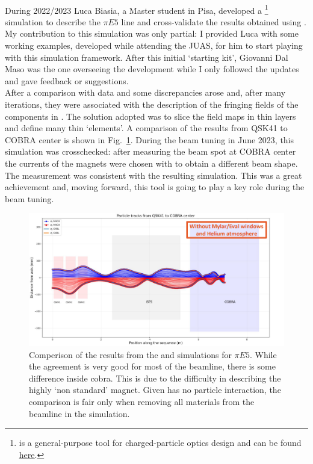 \begin{refsection}
        \paragraph{\madx} During 2022/2023 Luca Biasia, a Master student in Pisa, developed a \madx\footnote{\madx is a general-purpose tool for charged-particle optics design and can be found \href{http://madx.web.cern.ch/madx/}{\underline{here}}.} simulation to describe the $\pi E5$ line and cross-validate the results obtained using \gfb. 
        My contribution to this simulation was only partial: I provided Luca with some working \madx examples, developed while attending the JUAS, for him to start playing with this simulation framework. 
        After this initial `starting kit', Giovanni Dal Maso was the one overseeing the development while I only followed the updates and gave feedback or suggestions. \\
        After a comparison with data and \gfb some discrepancies arose and, after many iterations, they were associated with the description of the fringing fields of the components in \madx. 
        The solution adopted was to slice the field maps in thin layers and define many thin `\madx elements'. 
        A comparison of the results from QSK41 to COBRA center is shown in Fig.~\ref{fig:madx_vs_g4b}.
        During the beam tuning in June 2023, this simulation was crosschecked: after measuring the beam spot at COBRA center the currents of the magnets were chosen with \madx to obtain a different beam shape. 
        The measurement was consistent with the resulting simulation.
        This was a great achievement and, moving forward, this tool is going to play a key role during the beam tuning.

        \begin{figure}
            \centering
            \includegraphics[width = \textwidth]{Figures/MEG/madx_vs_g4b.png}
            \caption{Comperison of the results from the \gfb and \madx simulations for $\pi E5$. While the agreement is very good for most of the beamline, there is some difference inside cobra. This is due to the difficulty in describing the highly `non standard' magnet. Given \madx has no particle interaction, the comparison is fair only when removing all  materials from the beamline in the \gfb simulation.}
            \label{fig:madx_vs_g4b}
        \end{figure}
    

\end{refsection}
